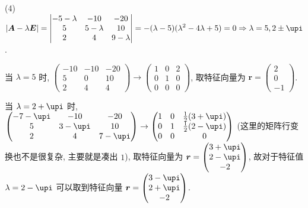 \begin{solution}
  (4) $\displaystyle|\bm{A}-\lambda\bm{E}|=\begin{vmatrix}-5-\lambda&-10&-20\\5&5-\lambda&10\\2&4&9-\lambda\end{vmatrix}=-(\lambda-5)(\lambda^2-4\lambda+5)=0\Rightarrow\lambda=5,2\pm\upi$.

  当 $\lambda=5$ 时, 
  $\begin{pmatrix}-10&-10&-20\\5&0&10\\2&4&4\end{pmatrix}\to\begin{pmatrix}1&0&2\\0&1&0\\0&0&0\end{pmatrix}$, 
  取特征向量为 $\bm{r}=\begin{pmatrix}2\\0\\-1\end{pmatrix}$.

  当 $\lambda=2+\upi$ 时, 
  $\begin{pmatrix}-7-\upi&-10&-20\\5&3-\upi&10\\2&4&7-\upi\end{pmatrix}\to\begin{pmatrix}1&0&\frac{1}{2}(3+\upi)\\0&1&\frac{1}{2}(2-\upi)\\0&0&0\end{pmatrix}$
  (这里的矩阵行变换也不是很复杂, 主要就是凑出 $1$), 
  取特征向量为 $\bm{r}=\begin{pmatrix}3+\upi\\2-\upi\\-2\end{pmatrix}$,
  故对于特征值 $\lambda=2-\upi$ 可以取到特征向量 $\bm{r}=\begin{pmatrix}3-\upi\\2+\upi\\-2\end{pmatrix}$.


\end{solution}
